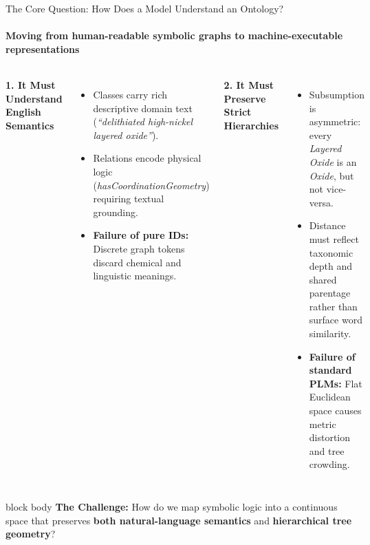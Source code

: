 \documentclass[aspectratio=169, 11pt]{beamer}
\begin{document}
\begin{frame}{The Core Question: How Does a Model Understand an Ontology?}
\framesubtitle{Moving from human-readable symbolic graphs to machine-executable representations}

\vspace{-0.2cm}
\begin{columns}[T]
    \scriptsize
    \textbf{1. It Must Understand English Semantics}
    \begin{itemize}\itemsep0.15em
        \item Classes carry rich descriptive domain text (\textit{``delithiated high-nickel layered oxide''}).
        \item Relations encode physical logic (\textit{hasCoordinationGeometry}) requiring textual grounding.
        \item \textbf{Failure of pure IDs:} Discrete graph tokens discard chemical and linguistic meanings.
    \end{itemize}

    \scriptsize
    \textbf{2. It Must Preserve Strict Hierarchies}
    \begin{itemize}\itemsep0.15em
        \item Subsumption is asymmetric: every \textit{Layered Oxide} is an \textit{Oxide}, but not vice-versa.
        \item Distance must reflect taxonomic depth and shared parentage rather than surface word similarity.
        \item \textbf{Failure of standard PLMs:} Flat Euclidean space causes metric distortion and tree crowding.
    \end{itemize}
\end{columns}

\vspace{0.15cm}
\begin{beamercolorbox}[rounded=true, sep=2.5pt]{block body}
    \centering\scriptsize
    \textbf{The Challenge:} How do we map symbolic logic into a continuous space that preserves \textbf{both natural-language semantics} and \textbf{hierarchical tree geometry}?
\end{beamercolorbox}

\vspace{0.15cm}
\centering
{}
\end{frame}
\end{document}
